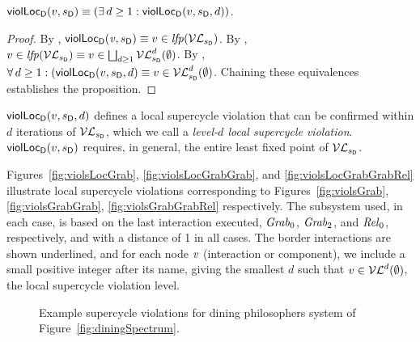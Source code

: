 \begin{proposition}
\label{prop:locViol-equiv-locViolDist}
$\mathsf{violLoc}_{\mathsf{D}}(v,s_\mathsf{D}) \equiv (\exists\, d \ge 1: \mathsf{violLoc}_{\mathsf{D}}(v,s_\mathsf{D},d))$.
\end{proposition}
%
\begin{proof}
By , $\mathsf{violLoc}_{\mathsf{D}}(\mathit{v},s_\mathsf{D}) \equiv v \in \mathit{lfp}(\mathcal{VL}_{s_\mathsf{D}})$.
By , $v \in \mathit{lfp}(\mathcal{VL}_{s_\mathsf{D}}) \equiv v \in \bigsqcup_{d \ge 1} \mathcal{VL}_{s_\mathsf{D}}^{d}(\emptyset)$.
By , $\forall\, d \ge 1: (\mathsf{violLoc}_{\mathsf{D}}(v,s_\mathsf{D},d) \equiv v \in \mathcal{VL}_{s_\mathsf{D}}^{d}(\emptyset)$.
Chaining these equivalences establishes the proposition.
\end{proof}
%
$\mathsf{violLoc}_{\mathsf{D}}(v,s_\mathsf{D},d)$ defines a local supercycle violation that can be confirmed within $d$ iterations of $\mathcal{VL}_{s_\mathsf{D}}$, which we call a
\emph{level-$d$ local supercycle violation}.
$\mathsf{violLoc}_{\mathsf{D}}(v,s_\mathsf{D})$ requires, in general, the entire least fixed point of $\mathcal{VL}_{s_\mathsf{D}}$.



\begin{example}
\label{exm:loc-dphils-viols}
Figures~\ref{fig:violsLocGrab}, \ref{fig:violsLocGrabGrab}, and \ref{fig:violsLocGrabGrabRel} illustrate local supercycle violations corresponding to
Figures~\ref{fig:violsGrab}, \ref{fig:violsGrabGrab}, \ref{fig:violsGrabGrabRel} respectively. The subsystem used, in each case, is based on the last interaction
executed, \ie $\mathit{Grab}_0$, $\mathit{Grab}_2$, and $\mathit{Rel}_0$, respectively, and with a distance of 1 in all cases.
The border interactions are shown underlined, and 
for each node $\mathit{v}$ (interaction or component), we include a small positive integer after its name, giving the smallest $d$ such that $v \in \mathcal{VL}^{d}(\emptyset)$, 
\ie the local supercycle violation level.
\end{example}



\begin{figure*}[ht]
  \begin{center}
      \quad \quad
       \quad \quad
      \caption{Example supercycle violations for dining philosophers system of Figure~\ref{fig:diningSpectrum}.}
       \label{fig:localDphilsViolations}
  \end{center}
\end{figure*}









